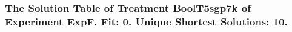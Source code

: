  \begin{frame}
 \fontsize{8pt}{9pt}\selectfont
 \frametitle{ The Solution Table of Treatment BoolT5sgp7k of Experiment ExpF. Fit: 0. Unique Shortest Solutions: 10. }

 \label{ExpFSolutionTable008.tex}  
 \end{frame}

